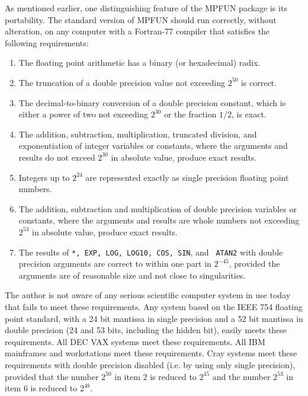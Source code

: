 \vspace{2ex}

As mentioned earlier, one distinguishing feature of the MPFUN package
is its portability.  The standard version of MPFUN should run
correctly, without alteration, on any computer with a Fortran-77
compiler that satisfies the following requirements:

\begin{enumerate}

\item The floating point arithmetic has a binary (or hexadecimal) radix.

\item The truncation of a double precision value not exceeding
$2^{50}$ is correct.

\item The decimal-to-binary conversion of a double precision constant,
which is either a power of two not exceeding $2^{30}$ or the fraction
$1/2$, is exact.

\item  The addition, subtraction, multiplication, truncated division,
and exponentiation of integer variables or constants, where the
arguments and results do not exceed $2^{30}$ in absolute value,
produce exact results.

\item Integers up to $2^{24}$ are represented exactly as single
precision floating point numbers.

\item The addition, subtraction and multiplication of double precision
variables or constants, where the arguments and results are whole
numbers not exceeding $2^{53}$ in absolute value, produce exact
results.

\item The results of {\tt **, EXP, LOG, LOG10, COS, SIN}, and {\tt
ATAN2} with double precision arguments are correct to within one part
in $2^{-45}$, provided the arguments are of reasonable size and not
close to singularities.

\end{enumerate}

The author is not aware of any serious scientific computer system in
use today that fails to meet these requirements.  Any system based on
the IEEE 754 floating point standard, with a 24 bit mantissa in single
precision and a 52 bit mantissa in double precision (24 and 53 bits,
including the hidden bit), easily meets these requirements.  All DEC
VAX systems meet these requirements.  All IBM mainframes and
workstations meet these requirements.  Cray systems meet these
requirements with double precision disabled (i.e. by using only single
precision), provided that the number $2^{50}$ in item 2 is reduced to
$2^{45}$ and the number $2^{53}$ in item 6 is reduced to $2^{48}$.

